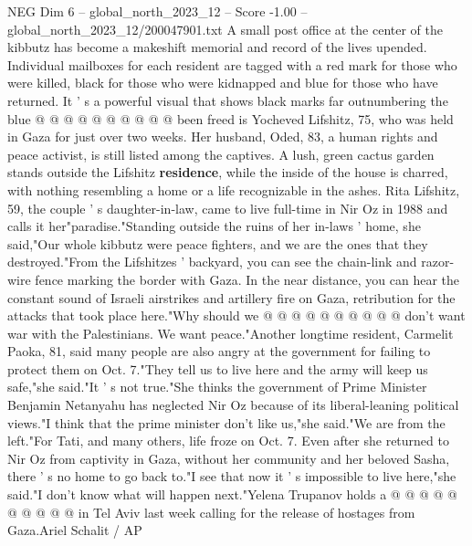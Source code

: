 \begin{textsample}{NEG Dim 6 – global\_north\_2023\_12 – Score -1.00 – global\_north\_2023\_12/200047901.txt}
A small post office at the center of the kibbutz has become a makeshift memorial and record of the lives upended.
Individual mailboxes for each resident are tagged with a red mark for those who were killed, black for those who were kidnapped and blue for those who have returned.
It ' s a powerful visual that shows black marks far outnumbering the blue @ @ @ @ @ @ @ @ @ @ been freed is Yocheved Lifshitz, 75, who was held in Gaza for just over two weeks.
Her husband, Oded, 83, a human rights and peace activist, is still listed among the captives.
A lush, green cactus garden stands outside the Lifshitz \textbf{residence}, while the inside of the house is charred, with nothing resembling a home or a life recognizable in the ashes.
Rita Lifshitz, 59, the couple ' s daughter-in-law, came to live full-time in Nir Oz in 1988 and calls it her"paradise."Standing outside the ruins of her in-laws ' home, she said,"Our whole kibbutz were peace fighters, and we are the ones that they destroyed."From the Lifshitzes ' backyard, you can see the chain-link and razor-wire fence marking the border with Gaza.
In the near distance, you can hear the constant sound of Israeli airstrikes and artillery fire on Gaza, retribution for the attacks that took place here."Why should we @ @ @ @ @ @ @ @ @ @ don't want war with the Palestinians.
We want peace."Another longtime resident, Carmelit Paoka, 81, said many people are also angry at the government for failing to protect them on Oct. 7."They tell us to live here and the army will keep us safe,"she said."It ' s not true."She thinks the government of Prime Minister Benjamin Netanyahu has neglected Nir Oz because of its liberal-leaning political views."I think that the prime minister don't like us,"she said."We are from the left."For Tati, and many others, life froze on Oct. 7.
Even after she returned to Nir Oz from captivity in Gaza, without her community and her beloved Sasha, there ' s no home to go back to."I see that now it ' s impossible to live here,"she said."I don't know what will happen next."Yelena Trupanov holds a @ @ @ @ @ @ @ @ @ @ in Tel Aviv last week calling for the release of hostages from Gaza.Ariel Schalit / AP

\end{textsample}
